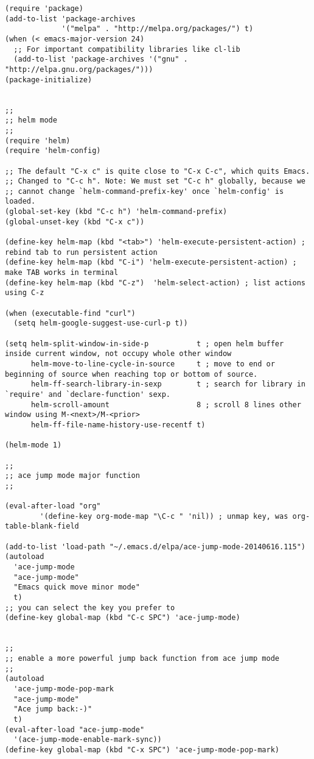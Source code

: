 \documentclass[11pt]{article}
\begin{document}
\begin{verbatim}
(require 'package)
(add-to-list 'package-archives
             '("melpa" . "http://melpa.org/packages/") t)
(when (< emacs-major-version 24)
  ;; For important compatibility libraries like cl-lib
  (add-to-list 'package-archives '("gnu" . "http://elpa.gnu.org/packages/")))
(package-initialize)


;;
;; helm mode
;;
(require 'helm)
(require 'helm-config)

;; The default "C-x c" is quite close to "C-x C-c", which quits Emacs.
;; Changed to "C-c h". Note: We must set "C-c h" globally, because we
;; cannot change `helm-command-prefix-key' once `helm-config' is loaded.
(global-set-key (kbd "C-c h") 'helm-command-prefix)
(global-unset-key (kbd "C-x c"))

(define-key helm-map (kbd "<tab>") 'helm-execute-persistent-action) ; rebind tab to run persistent action
(define-key helm-map (kbd "C-i") 'helm-execute-persistent-action) ; make TAB works in terminal
(define-key helm-map (kbd "C-z")  'helm-select-action) ; list actions using C-z

(when (executable-find "curl")
  (setq helm-google-suggest-use-curl-p t))

(setq helm-split-window-in-side-p           t ; open helm buffer inside current window, not occupy whole other window
      helm-move-to-line-cycle-in-source     t ; move to end or beginning of source when reaching top or bottom of source.
      helm-ff-search-library-in-sexp        t ; search for library in `require' and `declare-function' sexp.
      helm-scroll-amount                    8 ; scroll 8 lines other window using M-<next>/M-<prior>
      helm-ff-file-name-history-use-recentf t)

(helm-mode 1)

;;
;; ace jump mode major function
;;

(eval-after-load "org"
        '(define-key org-mode-map "\C-c " 'nil)) ; unmap key, was org-table-blank-field

(add-to-list 'load-path "~/.emacs.d/elpa/ace-jump-mode-20140616.115")
(autoload
  'ace-jump-mode
  "ace-jump-mode"
  "Emacs quick move minor mode"
  t)
;; you can select the key you prefer to
(define-key global-map (kbd "C-c SPC") 'ace-jump-mode)


;; 
;; enable a more powerful jump back function from ace jump mode
;;
(autoload
  'ace-jump-mode-pop-mark
  "ace-jump-mode"
  "Ace jump back:-)"
  t)
(eval-after-load "ace-jump-mode"
  '(ace-jump-mode-enable-mark-sync))
(define-key global-map (kbd "C-x SPC") 'ace-jump-mode-pop-mark)
\end{verbatim}
\end{document}
